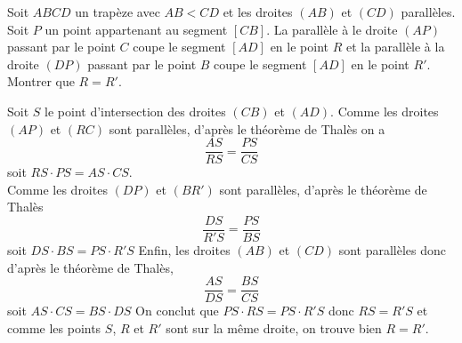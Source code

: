 \begin{exo}
Soit $ABCD$ un trapèze avec $AB<CD$ et les droites $(AB)$ et $(CD)$ parallèles. Soit $P$ un point appartenant au segment $[CB]$. La parallèle à le droite $(AP)$ passant par le point $C$ coupe le segment $[AD]$ en le point $R$ et la parallèle à la droite $(DP)$ passant par le point $B$ coupe le segment $[AD]$ en le point $R'$. Montrer que $R = R'$.
\end{exo}

\begin{sol}
\begin{center}
\end{center}

Soit $S$ le point d'intersection des droites $(CB)$ et $(AD)$. Comme les droites $(AP)$ et $(RC)$ sont parallèles, d'après le théorème de Thalès on a
$$\frac{AS}{RS}=\frac{PS}{CS}$$ soit $RS\cdot PS=AS\cdot CS$. \\
Comme les droites $(DP)$ et $(BR')$ sont parallèles, d'après le théorème de Thalès
$$\frac{DS}{R'S}=\frac{PS}{BS}$$ soit $DS\cdot BS= PS\cdot R'S$
Enfin, les droites $(AB)$ et $(CD)$ sont parallèles donc d'après le théorème de Thalès,
$$\frac{AS}{DS}=\frac{BS}{CS}$$ soit $AS\cdot CS=BS\cdot DS$
On conclut que $PS\cdot RS = PS\cdot R'S$ donc $RS=R'S$ et comme les points $S$, $R$ et $R'$ sont sur la même droite, on trouve bien $R = R'$.
\end{sol}


